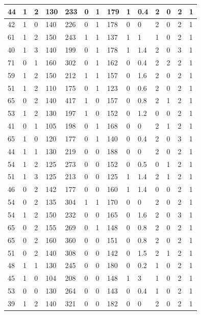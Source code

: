 \documentclass{article}
\begin{document}
\begin{table}[h!]
\begin{tabular}{|l|l|l|l|l|l|l|l|l|l|l|l|l|l|}
44 & 1 & 2 & 130 & 233 & 0 & 1 & 179 & 1 & 0.4 & 2  &0 & 2 & 1 \\ \hline
42 & 1 & 0 & 140 & 226 & 0 & 1 & 178 & 0 & 0 & 2  &0 & 2 & 1 \\ \hline
61 & 1 & 2 & 150 & 243 & 1 & 1 & 137 & 1 & 1 & 1  &0 & 2 & 1 \\ \hline
40 & 1 & 3 & 140 & 199 & 0 & 1 & 178 & 1 & 1.4 & 2  &0 & 3 & 1 \\ \hline
71 & 0 & 1 & 160 & 302 & 0 & 1 & 162 & 0 & 0.4 & 2  &2 & 2 & 1 \\ \hline
59 & 1 & 2 & 150 & 212 & 1 & 1 & 157 & 0 & 1.6 & 2  &0 & 2 & 1 \\ \hline
51 & 1 & 2 & 110 & 175 & 0 & 1 & 123 & 0 & 0.6 & 2  &0 & 2 & 1 \\ \hline
65 & 0 & 2 & 140 & 417 & 1 & 0 & 157 & 0 & 0.8 & 2  &1 & 2 & 1 \\ \hline
53 & 1 & 2 & 130 & 197 & 1 & 0 & 152 & 0 & 1.2 & 0  &0 & 2 & 1 \\ \hline
41 & 0 & 1 & 105 & 198 & 0 & 1 & 168 & 0 & 0 & 2  &1 & 2 & 1 \\ \hline
65 & 1 & 0 & 120 & 177 & 0 & 1 & 140 & 0 & 0.4 & 2  &0 & 3 & 1 \\ \hline
44 & 1 & 1 & 130 & 219 & 0 & 0 & 188 & 0 & 0 & 2  &0 & 2 & 1 \\ \hline
54 & 1 & 2 & 125 & 273 & 0 & 0 & 152 & 0 & 0.5 & 0  &1 & 2 & 1 \\ \hline
51 & 1 & 3 & 125 & 213 & 0 & 0 & 125 & 1 & 1.4 & 2  &1 & 2 & 1 \\ \hline
46 & 0 & 2 & 142 & 177 & 0 & 0 & 160 & 1 & 1.4 & 0  &0 & 2 & 1 \\ \hline
54 & 0 & 2 & 135 & 304 & 1 & 1 & 170 & 0 & 0 & 2  &0 & 2 & 1 \\ \hline
54 & 1 & 2 & 150 & 232 & 0 & 0 & 165 & 0 & 1.6 & 2  &0 & 3 & 1 \\ \hline
65 & 0 & 2 & 155 & 269 & 0 & 1 & 148 & 0 & 0.8 & 2  &0 & 2 & 1 \\ \hline
65 & 0 & 2 & 160 & 360 & 0 & 0 & 151 & 0 & 0.8 & 2  &0 & 2 & 1 \\ \hline
51 & 0 & 2 & 140 & 308 & 0 & 0 & 142 & 0 & 1.5 & 2  &1 & 2 & 1 \\ \hline
48 & 1 & 1 & 130 & 245 & 0 & 0 & 180 & 0 & 0.2 & 1  &0 & 2 & 1 \\ \hline
45 & 1 & 0 & 104 & 208 & 0 & 0 & 148 & 1 & 3 & 1  &0 & 2 & 1 \\ \hline
53 & 0 & 0 & 130 & 264 & 0 & 0 & 143 & 0 & 0.4 & 1  &0 & 2 & 1 \\ \hline
39 & 1 & 2 & 140 & 321 & 0 & 0 & 182 & 0 & 0 & 2  &0 & 2 & 1 \\ \hline

\end{tabular}
\end{table}
\end{document}
